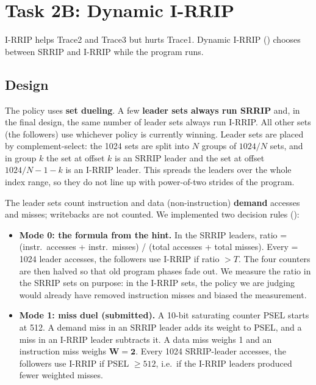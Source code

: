 \clearpage
\section{Task 2B: Dynamic I-RRIP}
I-RRIP helps Trace2 and Trace3 but hurts Trace1. Dynamic I-RRIP () chooses
between SRRIP and I-RRIP while the program runs.

\subsection{Design}
The policy uses \textbf{set dueling}. A few \textbf{leader sets always run SRRIP} and, in the final design, the same
number of leader sets always run I-RRIP. All other sets (the followers) use whichever policy is currently winning.
Leader sets are placed by complement-select: the 1024 sets are split into $N$ groups of $1024/N$ sets, and in group
$k$ the set at offset $k$ is an SRRIP leader and the set at offset $1024/N-1-k$ is an I-RRIP leader. This spreads
the leaders over the whole index range, so they do not line up with power-of-two strides of the program.

The leader sets count instruction and data (non-instruction) \textbf{demand} accesses and misses; writebacks are not
counted. We implemented two decision rules ():
\begin{itemize}
  \item \textbf{Mode 0: the formula from the hint.} In the SRRIP leaders,
        ratio = (instr.\ accesses + instr.\ misses) / (total accesses + total misses).
        Every  = 1024 leader accesses, the followers use I-RRIP if ratio $> T$. The four counters are
        then halved so that old program phases fade out. We measure the ratio in the SRRIP sets on purpose: in the
        I-RRIP sets, the policy we are judging would already have removed instruction misses and biased the measurement.
  \item \textbf{Mode 1: miss duel (submitted).} A 10-bit saturating counter PSEL starts at 512. A demand miss in an
        SRRIP leader adds its weight to PSEL, and a miss in an I-RRIP leader subtracts it. A data miss weighs 1 and an
        instruction miss weighs $\boldsymbol{W = 2}$. Every 1024 SRRIP-leader accesses, the followers use I-RRIP if
        PSEL $\ge 512$, i.e.\ if the I-RRIP leaders produced fewer weighted misses.
\end{itemize}


